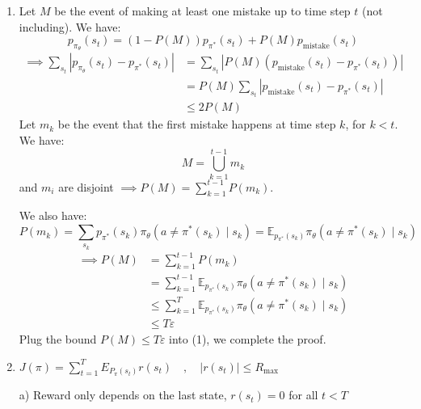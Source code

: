 \begin{solution}
    \begin{enumerate}
        \item Let $M$ be the event of making at least one mistake up to time step $t$
              (not including). We have:
              $$ p_{\pi_\theta}(s_t) = (1 - P(M))p_{\pi^*}(s_t) + P(M)p_{\text{mistake}}(s_t) $$
              \begin{align*}
                  \implies \sum_{s_t} |p_{\pi_\theta}(s_t) - p_{\pi^*}(s_t)|
                   & = \sum_{s_t} |P(M) (p_{\text{mistake}}(s_t) - p_{\pi^*}(s_t))| \\
                   & = P(M) \sum_{s_t} |p_{\text{mistake}}(s_t) - p_{\pi^*}(s_t)|   \\
                   & \le 2P(M) \tag{1}
              \end{align*}
              Let $m_k$ be the event that the first mistake happens at time step $k$,
              for $k < t$. We have:
              $$ M = \bigcup_{k=1}^{t-1} m_k $$
              and $m_i$ are disjoint $\implies P(M) = \sum_{k=1}^{t-1} P(m_k)$.

              We also have:
              $$ P(m_k) = \sum_{s_k} p_{\pi^*}(s_k) \pi_\theta (a \neq \pi^*(s_k) \mid s_k)
                  = \mathbb{E}_{p_{\pi^*}(s_k)} \pi_\theta(a \neq \pi^*(s_k) \mid s_k) $$
              \begin{align*}
                  \implies P(M) & = \sum_{k=1}^{t-1} P(m_k)                                                             \\
                                & = \sum_{k=1}^{t-1} \mathbb{E}_{p_{\pi^*}(s_k)} \pi_\theta(a \neq \pi^*(s_k) \mid s_k) \\
                                & \le \sum_{k=1}^{T} \mathbb{E}_{p_{\pi^*}(s_k)} \pi_\theta(a \neq \pi^*(s_k) \mid s_k) \\
                                & \le T\varepsilon
              \end{align*}
              Plug the bound $P(M) \le T\varepsilon$ into (1), we complete the proof.
        \item $J(\pi) = \sum_{t=1}^{T} E_{P_{\pi}(s_t)} r(s_t) \quad , \quad |r(s_t)| \le R_{\max}$

              a) Reward only depends on the last state, $r(s_t) = 0$ for all $t < T$


\end{enumerate}
\end{solution}
